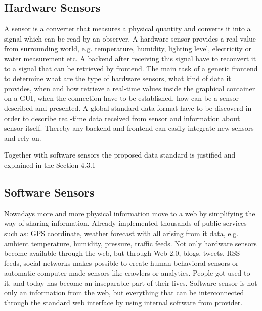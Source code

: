 	\subsection {Hardware Sensors}
	A sensor is a converter that measures a physical quantity and converts it into a signal which can be read by an observer. A hardware sensor provides a real value from surrounding world, e.g. temperature, humidity, lighting level,  electricity or water measurement etc. A backend after receiving this signal have to reconvert it to a signal that can be retrieved by frontend. The main task of a generic frontend to determine what are the type of hardware sensors, what kind of data it provides, when and how retrieve a real-time values inside the graphical container on a GUI, when the connection have to be established, how can be a sensor described and presented. A global standard data format have to be discoverd in order to describe real-time data received from sensor and information about sensor itself. Thereby any backend and frontend can easily integrate new sensors and rely on.

    Together with software sensors the proposed data standard is justified and explained in the Section 4.3.1

	\subsection {Software Sensors}
	Nowadays more and more physical information move to a web by simplifying the way of sharing information. Already implemented thousands of public services such as: GPS coordinate, weather forecast with all arising from it data, e.g. ambient temperature, humidity, pressure, traffic feeds. Not only hardware sensors become available through the web, but through Web 2.0, blogs, tweets, RSS feeds, social networks makes possible to create human-behavioral sensors or automatic computer-made sensors like crawlers or analytics. People got used to it, and today has become an inseparable part of their lives. Software sensor is not only an information from the web, but everything that can be interconnected through the standard web interface by using internal software from provider.
	
